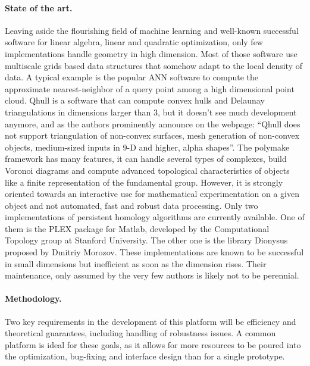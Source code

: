 \paragraph{State of the art.}  
Leaving aside the flourishing field of machine learning
and well-known successful software for linear algebra,
linear and quadratic optimization,  only  few implementations handle
geometry in high dimension. 
Most of those software use multiscale  grids based
data structures that somehow adapt
 to the local  density of data.
A typical example is the popular ANN software to compute  the approximate
nearest-neighbor of a query point
among a  high dimensional point cloud. 
Qhull is a software that can compute convex hulls and Delaunay
triangulations in dimensions larger than 3, but it doesn't see much
development anymore, and as the authors prominently announce on the
webpage: ``Qhull does not support triangulation of non-convex surfaces,
mesh generation of non-convex objects, medium-sized inputs in 9-D and
higher, alpha shapes''. The polymake framework has many features,
it can handle several types of complexes, build Voronoi diagrams and
compute advanced topological characteristics of objects like a finite
representation of the fundamental group. However, it is strongly
oriented towards an interactive use for mathematical experimentation on
a given object and not automated, fast and robust data processing.
Only two implementations of persistent homology algorithms are
currently available. One of them is the PLEX package for Matlab,
developed by the Computational Topology group at Stanford University.
The other one is the
library Dionysus proposed by Dmitriy Morozov. These implementations
are known to be
successful in small dimensions but inefficient as soon as the
dimension rises.  Their  maintenance, only assumed by the very few authors
is likely not to be perennial.



\paragraph{Methodology.} 
Two key requirements in the development of this platform will be
efficiency and theoretical guarantees, including handling of
robustness issues. A common
platform is ideal for these goals, as it allows for more
resources to be poured into the optimization, bug-fixing and interface
design than for a single prototype.

